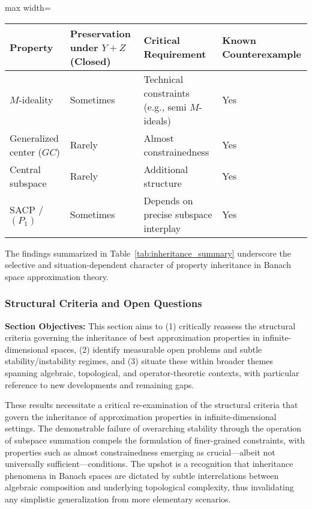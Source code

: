 \documentclass[sigconf]{acmart}
\begin{document}
\begin{table*}[htbp]
\centering
\caption{Summary of Stability and Inheritance for Key Properties under Subspace Sum}
\label{tab:inheritance_summary}
\begin{adjustbox}{max width=\textwidth}
\begin{tabular}{llll}
\toprule
\textbf{Property} & \textbf{Preservation under $Y+Z$ (Closed)} & \textbf{Critical Requirement} & \textbf{Known Counterexample} \\
\midrule
$M$-ideality        & Sometimes                    & Technical constraints (e.g., semi $M$-ideals)   & Yes \\
Generalized center ($GC$)   & Rarely                       & Almost constrainedness                        & Yes \\
Central subspace    & Rarely                       & Additional structure                           & Yes \\
SACP / $(P_1)$      & Sometimes                    & Depends on precise subspace interplay          & Yes \\
\bottomrule
\end{tabular}
\end{adjustbox}
\end{table*}

The findings summarized in Table~\ref{tab:inheritance_summary} underscore the selective and situation-dependent character of property inheritance in Banach space approximation theory.

\subsubsection{Structural Criteria and Open Questions}

\textbf{Section Objectives:} This section aims to (1) critically reassess the structural criteria governing the inheritance of best approximation properties in infinite-dimensional spaces, (2) identify measurable open problems and subtle stability/instability regimes, and (3) situate these within broader themes spanning algebraic, topological, and operator-theoretic contexts, with particular reference to new developments and remaining gaps.

These results necessitate a critical re-examination of the structural criteria that govern the inheritance of approximation properties in infinite-dimensional settings. The demonstrable failure of overarching stability through the operation of subspace summation compels the formulation of finer-grained constraints, with properties such as almost constrainedness emerging as crucial—albeit not universally sufficient—conditions. The upshot is a recognition that inheritance phenomena in Banach spaces are dictated by subtle interrelations between algebraic composition and underlying topological complexity, thus invalidating any simplistic generalization from more elementary scenarios.
\end{document}
